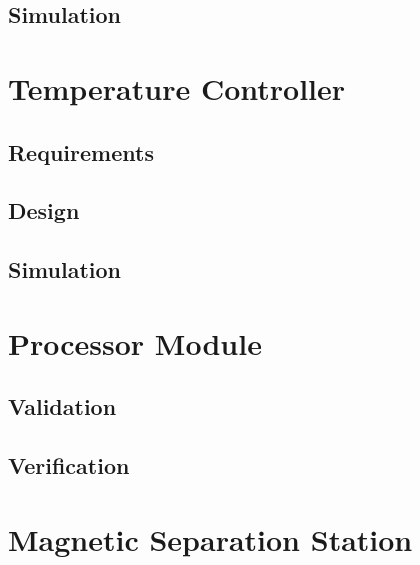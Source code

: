 \subsection{Simulation}

\section{Temperature Controller}

\subsection{Requirements}

\subsection{Design}

\subsection{Simulation}

\section{Processor Module}

\subsection{Validation}

\subsection{Verification}

\section{Magnetic Separation Station}